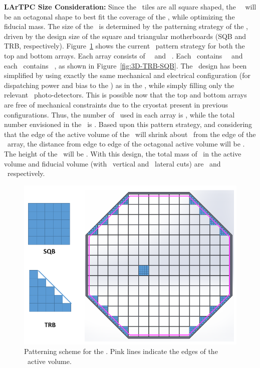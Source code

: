 {\bf LArTPC Size Consideration:} Since the \SiPM\ tiles are all square shaped, the \DSks\ \TPC\ will be an octagonal shape to best fit the coverage of the \DSkPdm, while optimizing the fiducial mass.  The size of the \TPC\ is determined by the patterning strategy of the \SiPMs, driven by the design size of the square and triangular motherboards (SQB and TRB, respectively).  Figure~\ref{fig:TPC-SiPM_pattern} shows the current \SiPM\ pattern strategy for both the top and bottom arrays. Each array consists of \DSkArraySQBNumber\ \SQBs\ and \DSkArrayTRBNumber\ \TRBs. Each \TRB\ contains \DSkTRBPdmsNumber\ \DSkPdms\ and each \SQB\ contains \DSkSQBPdmsNumber\ \DSkPdms, as shown in Figure~\ref{fig:3D-TRB-SQB}. 
The \TRB\ design has been simplified by using exactly the same mechanical and electrical configuration (for dispatching power and bias to the \DSkPdms) as in the \SQB, while simply filling only the relevant \DSkTRBPdmsNumber\ photo-detectors. This is possible now that the top and bottom arrays are free of mechanical constraints due to the cryostat present in previous configurations.
%
Thus, the number of \DSkPdms\ used in each array is \DSkTilesHalfNumber, while the total number envisioned in the \TPC\ is \DSkTilesNumber.  Based upon this pattern strategy, and considering that the edge of the active volume of the \TPC\ will shrink about \DSkEdgeActiveVolumeShrinkage\ from the edge of the \SiPM\ array, the distance from edge to edge of the octagonal active volume will be \DSkActiveDiameter.  The height of the \TPC\ will be \DSkTPCHeight. With this design, the total mass of \LAr\ in the active volume and fiducial volume (with \DSkVetoFVTPCcutz\ vertical and \DSkVetoFVTPCcut\ lateral cuts) are \DSkActiveMass\ and \DSkFiducialMass\ respectively. 

\begin{figure}[t!]
\centering
\includegraphics[width=\columnwidth]{Figures/TPC-SiPM_pattern.png}
\caption[\DSkPdm\ patterning scheme]{Patterning scheme for the \DSkPdms.  Pink lines indicate the edges of the \TPC\ active volume.}
\label{fig:TPC-SiPM_pattern}
\end{figure} 

